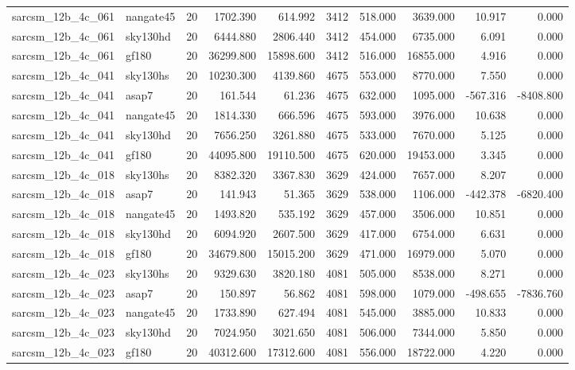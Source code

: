 \begin{tabular}{llrrrrrrrr}
sarcsm\_12b\_4c\_061 & nangate45 & 20 & 1702.390 & 614.992 & 3412 & 518.000 & 3639.000 & 10.917 & 0.000 \\
sarcsm\_12b\_4c\_061 & sky130hd & 20 & 6444.880 & 2806.440 & 3412 & 454.000 & 6735.000 & 6.091 & 0.000 \\
sarcsm\_12b\_4c\_061 & gf180 & 20 & 36299.800 & 15898.600 & 3412 & 516.000 & 16855.000 & 4.916 & 0.000 \\
sarcsm\_12b\_4c\_041 & sky130hs & 20 & 10230.300 & 4139.860 & 4675 & 553.000 & 8770.000 & 7.550 & 0.000 \\
sarcsm\_12b\_4c\_041 & asap7 & 20 & 161.544 & 61.236 & 4675 & 632.000 & 1095.000 & -567.316 & -8408.800 \\
sarcsm\_12b\_4c\_041 & nangate45 & 20 & 1814.330 & 666.596 & 4675 & 593.000 & 3976.000 & 10.638 & 0.000 \\
sarcsm\_12b\_4c\_041 & sky130hd & 20 & 7656.250 & 3261.880 & 4675 & 533.000 & 7670.000 & 5.125 & 0.000 \\
sarcsm\_12b\_4c\_041 & gf180 & 20 & 44095.800 & 19110.500 & 4675 & 620.000 & 19453.000 & 3.345 & 0.000 \\
sarcsm\_12b\_4c\_018 & sky130hs & 20 & 8382.320 & 3367.830 & 3629 & 424.000 & 7657.000 & 8.207 & 0.000 \\
sarcsm\_12b\_4c\_018 & asap7 & 20 & 141.943 & 51.365 & 3629 & 538.000 & 1106.000 & -442.378 & -6820.400 \\
sarcsm\_12b\_4c\_018 & nangate45 & 20 & 1493.820 & 535.192 & 3629 & 457.000 & 3506.000 & 10.851 & 0.000 \\
sarcsm\_12b\_4c\_018 & sky130hd & 20 & 6094.920 & 2607.500 & 3629 & 417.000 & 6754.000 & 6.631 & 0.000 \\
sarcsm\_12b\_4c\_018 & gf180 & 20 & 34679.800 & 15015.200 & 3629 & 471.000 & 16979.000 & 5.070 & 0.000 \\
sarcsm\_12b\_4c\_023 & sky130hs & 20 & 9329.630 & 3820.180 & 4081 & 505.000 & 8538.000 & 8.271 & 0.000 \\
sarcsm\_12b\_4c\_023 & asap7 & 20 & 150.897 & 56.862 & 4081 & 598.000 & 1079.000 & -498.655 & -7836.760 \\
sarcsm\_12b\_4c\_023 & nangate45 & 20 & 1733.890 & 627.494 & 4081 & 545.000 & 3885.000 & 10.833 & 0.000 \\
sarcsm\_12b\_4c\_023 & sky130hd & 20 & 7024.950 & 3021.650 & 4081 & 506.000 & 7344.000 & 5.850 & 0.000 \\
sarcsm\_12b\_4c\_023 & gf180 & 20 & 40312.600 & 17312.600 & 4081 & 556.000 & 18722.000 & 4.220 & 0.000 \\

\end{tabular}

